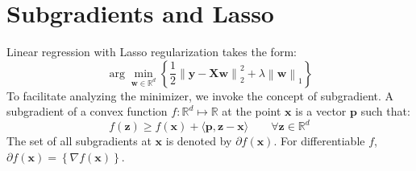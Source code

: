 \documentclass[a4paper, 10pt]{article}
\begin{document}
\clearpage

\section{Subgradients and Lasso}

Linear regression with Lasso regularization takes the form:
\begin{equation}
    \arg\min_{\mathbf{w}\in \mathbb{R}^d} \left\{ \frac{1}{2} \left\|\mathbf{y} - \mathbf{X} \mathbf{w}\right\|_2^2 +  \lambda \left\|\mathbf{w}\right\|_1 \right\}
\end{equation}
To facilitate analyzing the minimizer, we invoke the concept of subgradient. A subgradient of a convex function $f: \mathbb{R}^d \mapsto \mathbb{R}$ at the point $\mathbf{x}$ is a vector $\mathbf{p}$ such that:
\begin{equation}
    f(\mathbf{z}) \geq f(\mathbf{x}) + \langle \mathbf{p}, \mathbf{z} - \mathbf{x} \rangle \qquad \forall \mathbf{z} \in \mathbb{R}^d
\end{equation}
The set of all subgradients at $\mathbf{x}$ is denoted by $\partial f(\mathbf{x})$. For differentiable $f$, $\partial f(\mathbf{x}) = \left\{\nabla f(\mathbf{x})\right\}$.
\end{document}
